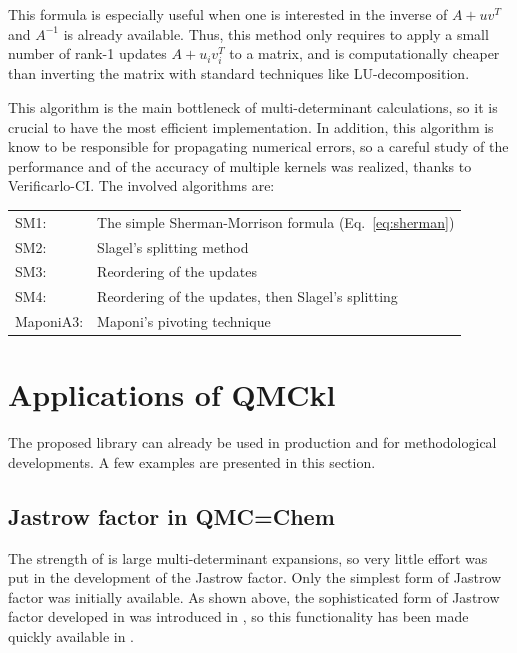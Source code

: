 This formula is especially useful when one is interested in the
inverse of $A + uv^T$ and $A^{-1}$ is already available. Thus, this 
method only requires to apply a small number of rank-1 updates $A + u_i v_i^T$
to a matrix, and is computationally cheaper than inverting the matrix
with standard techniques like LU-decomposition.

This algorithm is the main bottleneck of multi-determinant
calculations, so it is crucial to have the most efficient
implementation. In addition, this algorithm is know to be responsible
for propagating numerical errors, so a careful study of the
performance and of the accuracy of multiple kernels was realized,
thanks to Verificarlo-CI. The involved algorithms are:
\begin{center}
\begin{tabular}{ll}
  SM1:      & The simple Sherman-Morrison formula (Eq.~\eqref{eq:sherman}) \\
  SM2:      & Slagel's splitting method\cite{slagel_splitting} \\
  SM3:      & Reordering of the updates \\
  SM4:      & Reordering of the updates, then Slagel's splitting \\
  MaponiA3: & Maponi's pivoting technique\cite{maponi} \\
\end{tabular}
\end{center}



\section{Applications of QMCkl}

The proposed library can already be used in production and for
methodological developments. A few examples are presented in this section.

\subsection{Jastrow factor in QMC=Chem}

The strength of \qmcchem{} is large multi-determinant expansions, so very
little effort was put in the development of the Jastrow factor. Only the
simplest form of Jastrow factor was initially available. As shown above, the
sophisticated form of Jastrow factor developed in \champ{} was introduced
in \QMCkl{}, so this functionality has been made quickly available
in \qmcchem{}.

